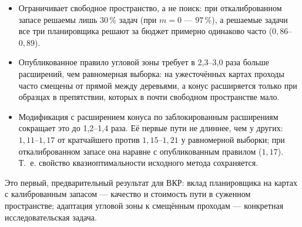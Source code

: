 \begin{itemize}[nosep]
  \item Ограничивает свободное пространство, а не поиск: при откалиброванном запасе решаемы лишь $30\,\%$ задач (при $m = 0$ --- $97\,\%$), а решаемые задачи все три планировщика решают за бюджет примерно одинаково часто ($0{,}86$--$0{,}89$).
  \item Опубликованное правило угловой зоны требует в 2{,}3--3{,}0 раза больше расширений, чем равномерная выборка: на ужесточённых картах проходы часто смещены от прямой между деревьями, а конус расширяется только при образцах в препятствии, которых в почти свободном пространстве мало.
  \item Модификация с расширением конуса по заблокированным расширениям сокращает это до 1{,}2--1{,}4 раза. Её первые пути не длиннее, чем у других: $1{,}11$--$1{,}17$ от кратчайшего против $1{,}15$--$1{,}21$ у равномерной выборки; при откалиброванном запасе она наравне с опубликованным правилом ($1{,}17$). Т.~е. свойство квазиоптимальности исходного метода сохраняется.
\end{itemize}
Это первый, предварительный результат для ВКР: вклад планировщика на картах с калиброванным запасом --- качество и стоимость пути в суженном пространстве; адаптация угловой зоны к смещённым проходам --- конкретная исследовательская задача.

